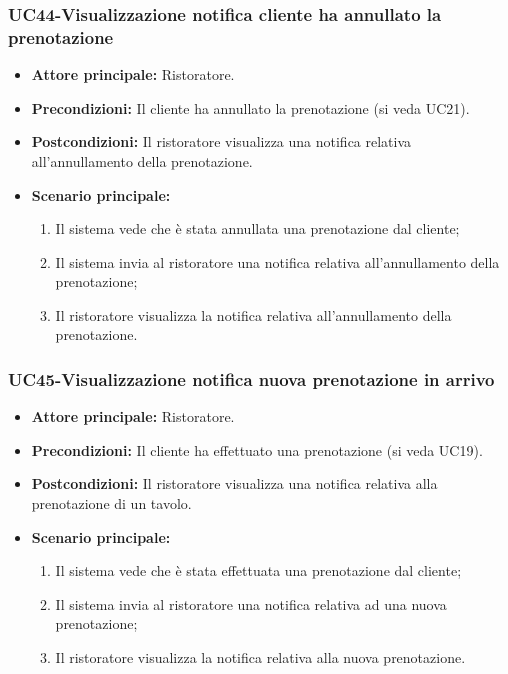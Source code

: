 \subsubsection{UC44-Visualizzazione notifica cliente ha annullato la prenotazione}
\begin{itemize}
\item \textbf{Attore principale:} Ristoratore.
\item \textbf{Precondizioni:} Il cliente ha annullato la prenotazione (si veda UC21).
\item \textbf{Postcondizioni:} Il ristoratore visualizza una notifica relativa all'annullamento della prenotazione.
\item \textbf{Scenario principale:}
\begin{enumerate}
    \item Il sistema vede che è stata annullata una prenotazione dal cliente;
    \item Il sistema invia al ristoratore una notifica relativa all'annullamento della prenotazione;
    \item Il ristoratore visualizza la notifica relativa all'annullamento della prenotazione.
\end{enumerate}
\end{itemize}

\subsubsection{UC45-Visualizzazione notifica nuova prenotazione in arrivo}
\begin{itemize}
\item \textbf{Attore principale:} Ristoratore.
\item \textbf{Precondizioni:} Il cliente ha effettuato una prenotazione (si veda UC19).
\item \textbf{Postcondizioni:} Il ristoratore visualizza una notifica relativa alla prenotazione di un tavolo.
\item \textbf{Scenario principale:}
\begin{enumerate}
    \item Il sistema vede che è stata effettuata una prenotazione dal cliente;
    \item Il sistema invia al ristoratore una notifica relativa ad una nuova prenotazione;
    \item Il ristoratore visualizza la notifica relativa alla nuova prenotazione.
\end{enumerate}
\end{itemize}

